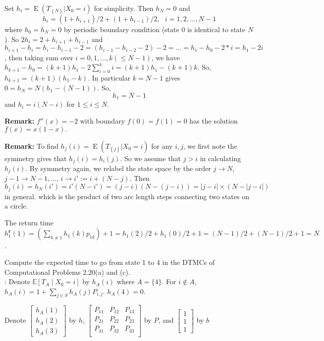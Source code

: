 \documentclass[  11pt]{article}
\newcommand{\e}{ \operatorname{E}}
\newcommand{\abs}[1]{\left\vert#1\right\vert}
\newcommand{\set}[1]{\left\{#1\right\}}
\newcommand{\rt}{{\textbf{r}}}
\begin{document}
\begin{ExerciseList}
\Answer
Set $h_i =\e( T_{\set{N}}  | X_0=i)$ for simplicity.
Then $h_N=0$ and
\[  h_{i}= (1+h_{i+1})/2 + (1+h_{i-1})/2  ,  ~~~i =1,2,\ldots, N-1  \]
where $h_{0}=h_{N}=0$ by periodic boundary condition
(state $0$ is identical to state $N$).
So $2h_{i}= 2+ h_{i+1} + h_{i-1}$ and 
$h_{i+1}-h_{i}=h_i-h_{i-1}-2 =(h_{i-1}-h_{i-2}-2)-2
=\ldots=h_1-h_0 - 2*i=h_1-2i$, then
taking sum over $i=0,1,\ldots,k(\leq N-1)$,
we have $h_{k+1}-h_0= (k+1) h_1 - 2\sum_{i=0}^{k}i=
(k+1) h_1 - (k+1)k$.
So, $h_{k+1}=(k+1) (h_1-k)$.
In particular $k=N-1$ gives  $0=h_N=N(h_1-(N-1))$. So,
\[h_1 =  N-1\]
and $h_i = i (N-i)$ for $1\leq i\leq N$.

{\bf Remark:}  $f''(x)=-2$ with boundary $f(0)=f(1)=0$ has the solution  $f(x)=x(1-x).$

{\bf Remark: } To find  $h_j(i) =\e( T_{\set{j}}  | X_0=i)$ for any $i,j$,
we first note the symmetry gives that $h_{j}(i)=h_{i}(j)$.
So we assume that $j>i$ in calculating $h_j(i)$.
By symmetry again, we relabel the state  space by the order 
$j\to  {N}$, $j-1\to  {N-1},\ldots$,
$i\to  i':= i+ (N-j)$.
Then $h_{j}(i)=h_N(i')=i'(N-i') = (j-i) ( N - (j-i))
=\abs{j-i} \times (N  - \abs{j-i})$ in general.
which is the product of two arc length steps 
connecting  two states on a circle.

The return time 
$h^\rt_1(1)
= \left( \sum_{k\neq 1} h_1(k) p_{1k} \right) +1=
h_1(2)/2 + h_1(0)/2+1
=(N-1)/2+(N-1)/2+1=N$.

\Exercise[origin={p57 2.42}] Compute the expected time to go from state 1 to 4 in the DTMCs of Computational Problems 2.20(a) and (c).\\

\Answer:
Denote $\mathbb{E}[T_A \mid X_0 = i]$ by $h_{A}(i)$ where $A = \{4\}$. For $i \notin A$, $h_{A}(i) = 1 + \sum_{j\in S} h_{A}(j)P_{i,j}$. $h_{A}(4) = 0$.\par
Denote $\begin{bmatrix}
h_A(1)\\h_A(2)\\h_A(3)
\end{bmatrix}$ by $h$, $\begin{bmatrix}
P_{11} &P_{12} &P_{13} \\
P_{21}& P_{22} &P_{23} \\
P_{31} &P_{32}& P_{33} \\
\end{bmatrix}$ by $P$, and $\begin{bmatrix}
1 \\ 1 \\ 1
\end{bmatrix}$ by $b$


\end{ExerciseList}
\end{document}
